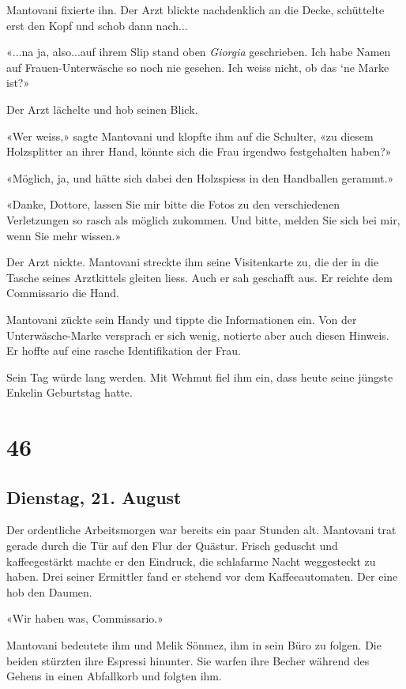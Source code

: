 Mantovani fixierte ihn. Der Arzt blickte nachdenklich an die Decke,
schüttelte erst den Kopf und schob dann nach...

«...na ja, also...auf ihrem Slip stand oben \emph{Giorgia} geschrieben.
Ich habe Namen auf Frauen-Unterwäsche so noch nie gesehen. Ich weiss
nicht, ob das `ne Marke ist?»

Der Arzt lächelte und hob seinen Blick.

«Wer weiss,» sagte Mantovani und klopfte ihm auf die Schulter, «zu
diesem Holzsplitter an ihrer Hand, könnte sich die Frau irgendwo
festgehalten haben?»

«Möglich, ja, und hätte sich dabei den Holzspiess in den Handballen
gerammt.»

«Danke, Dottore, lassen Sie mir bitte die Fotos zu den verschiedenen
Verletzungen so rasch als möglich zukommen. Und bitte, melden Sie sich
bei mir, wenn Sie mehr wissen.»

Der Arzt nickte. Mantovani streckte ihm seine Visitenkarte zu, die der
in die Tasche seines Arztkittels gleiten liess. Auch er sah geschafft
aus. Er reichte dem Commissario die Hand.

Mantovani zückte sein Handy und tippte die Informationen ein. Von der
Unterwäsche-Marke versprach er sich wenig, notierte aber auch diesen
Hinweis. Er hoffte auf eine rasche Identifikation der Frau.

Sein Tag würde lang werden. Mit Wehmut fiel ihm ein, dass heute seine
jüngste Enkelin Geburtstag hatte.

\chapter{46}\label{section-46}

\section{Dienstag, 21. August}\label{dienstag-21.-august-1}

Der ordentliche Arbeitsmorgen war bereits ein paar Stunden alt.
Mantovani trat gerade durch die Tür auf den Flur der Quästur. Frisch
geduscht und kaffeegestärkt machte er den Eindruck, die schlafarme Nacht
weggesteckt zu haben. Drei seiner Ermittler fand er stehend vor dem
Kaffeeautomaten. Der eine hob den Daumen.

«Wir haben was, Commissario.»

Mantovani bedeutete ihm und Melik Sönmez, ihm in sein Büro zu folgen.
Die beiden stürzten ihre Espressi hinunter. Sie warfen ihre Becher
während des Gehens in einen Abfallkorb und folgten ihm.

